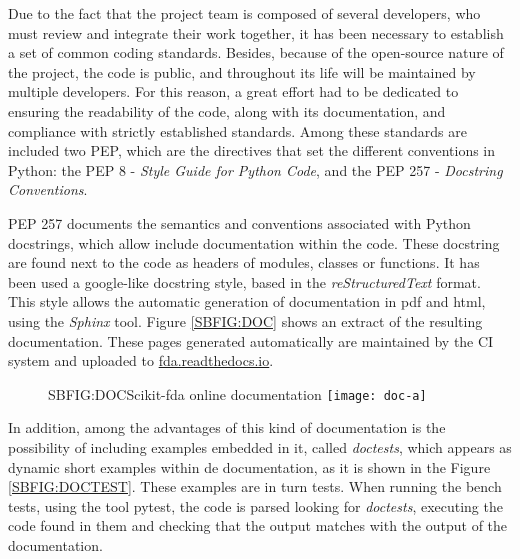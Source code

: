 

Due to the fact that the project team is composed of several developers, who
must review and integrate their work together, it has been necessary to
establish a set of common coding standards.
Besides, because of the open-source nature of the project, the code is
public, and throughout its life will be maintained by multiple developers. For
this reason, a great effort had to be dedicated to ensuring the readability of
the code, along with its documentation, and compliance with strictly established
standards. Among these standards are included two \ac{PEP}, which are the directives that set the different conventions in Python:
the \ac{PEP} 8 - \textit{Style Guide for Python Code}, and the \acs{PEP} 257 - \textit{Docstring Conventions}.
\newpage

\acs{PEP} 257 documents the semantics and conventions associated with Python
docstrings, which allow include documentation within the code. These docstring
are found next to the code as headers of modules, classes or functions. It has
been used a google-like docstring style, based in the \textit{reStructuredText} format.
This style allows the automatic generation of documentation in pdf and html,
using the \textit{Sphinx} tool. Figure \ref{SBFIG:DOC} shows an extract of the resulting documentation. These pages generated automatically are maintained by
the \ac{CI} system and uploaded to
\href{https://fda.readthedocs.io/}{fda.readthedocs.io}.

\begin{figure}[Scikit-fda online documentation]{SBFIG:DOC}{Scikit-fda online documentation}
	\texttt{[image: doc-a]}
\end{figure}

In addition, among the advantages of this kind of documentation is the
possibility of including examples embedded in it, called \textit{doctests}, which appears
 as dynamic short examples within de documentation, as it is shown in the
 Figure \ref{SBFIG:DOCTEST}.
These examples are in turn tests. When running the bench tests, using the tool
pytest, the code is parsed looking for \textit{doctests}, executing the code found in
them and checking that the output matches with the output of the documentation.

